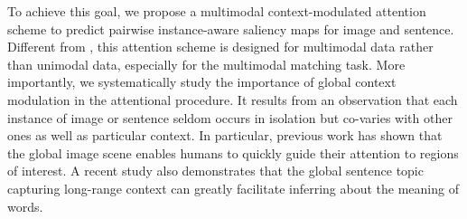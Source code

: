 \documentclass[10pt,twocolumn,letterpaper]{article}
\begin{document}
To achieve this goal,
we propose a multimodal context-modulated attention scheme
to predict pairwise instance-aware saliency maps for image and sentence.
Different from \cite{xu2015show},
this attention scheme is designed for multimodal data rather than unimodal data,
especially for the multimodal matching task.
More importantly, we systematically study the importance of global context modulation
in the attentional procedure.
It results from an observation that
each instance of image or sentence seldom occurs in isolation but co-varies with other
ones as well as particular context.
In particular, previous work \cite{oliva2007role} has shown that the global image scene
enables humans to quickly guide their attention to regions of interest.
A recent study \cite{ghosh2016contextual} also demonstrates that the
global sentence topic capturing long-range context can greatly
facilitate inferring about the meaning of words.
\end{document}

